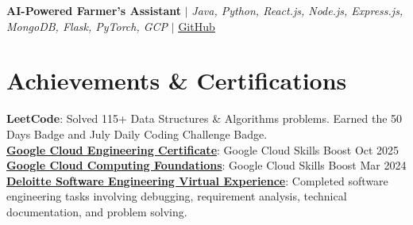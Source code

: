 \resumeProjectHeading
{\textbf{AI-Powered Farmer's Assistant} $|$ \emph{Java, Python, React.js, Node.js, Express.js, MongoDB, Flask, PyTorch, GCP} $|$
\href{https://github.com/Bhanuagrawal41/farmer-ease}{\underline{GitHub}}}{}

\resumeItemListStart





\resumeItemListEnd

\resumeSubHeadingListEnd

\vspace{-10pt}
\section{Achievements \& Certifications}

\begin{itemize}[leftmargin=0.15in,label={}]

\small{\item{

\textbf{LeetCode}{: Solved 115+ Data Structures \& Algorithms problems. Earned the 50 Days Badge and July Daily Coding Challenge Badge.} \\

\textbf{\href{https://www.credly.com/badges/b6414db4-272a-4f46-8efd-e16392b6c74e/public_url}{Google Cloud Engineering Certificate}}{: Google Cloud Skills Boost \hfill Oct 2025} \\

\textbf{\href{https://www.credly.com/badges/21bc1780-fa45-471c-97ff-45fe07ac3cc4/public_url}{Google Cloud Computing Foundations}}{: Google Cloud Skills Boost \hfill Mar 2024} \\

\textbf{\href{https://www.theforage.com/completion-certificates/9PBTqmSxAf6zZTseP/udmxiyHeqYQLkTPvf_9PBTqmSxAf6zZTseP_uYxeqxseAQ8zNBEk8_1752063993660_completion_certificate.pdf}{Deloitte Software Engineering Virtual Experience}}{: Completed software engineering tasks involving debugging, requirement analysis, technical documentation, and problem solving.}

}}

\end{itemize}

